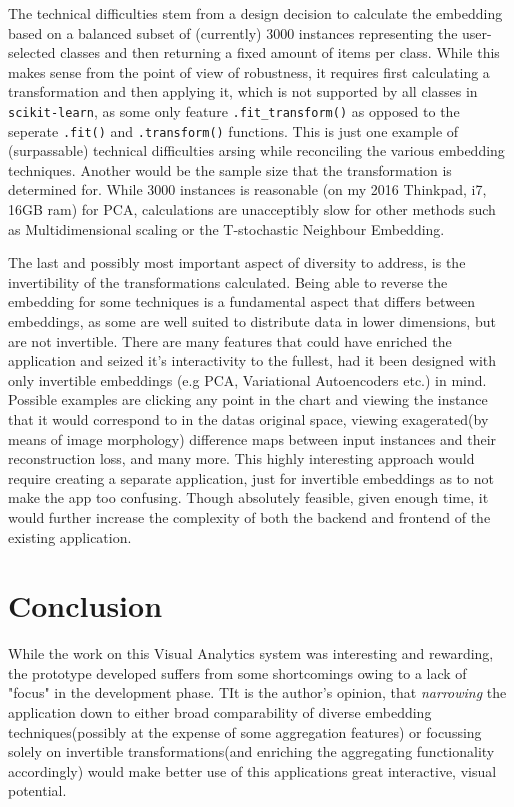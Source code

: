 \documentclass[11pt,a4paper]{article}
\begin{document}
        The technical difficulties stem from a design decision to calculate the embedding based on a balanced subset of (currently) 3000 instances representing the user-selected classes and then returning a fixed amount of items per class. While this makes sense from the point of view of robustness, it requires first calculating a transformation and then applying it, which is not supported by all classes in \texttt{scikit-learn}, as some only feature \texttt{.fit\_transform()} as opposed to the seperate \texttt{.fit()} and \texttt{.transform()} functions. This is just one example of (surpassable) technical difficulties arsing while reconciling the various embedding techniques. Another would be the sample size that the transformation is determined for. While 3000 instances is reasonable (on my 2016 Thinkpad, i7, 16GB ram) for PCA, calculations are unacceptibly slow for other methods such as Multidimensional scaling or the T-stochastic Neighbour Embedding.

        The last and possibly most important aspect of diversity to address, is the invertibility of the transformations calculated. Being able to reverse the embedding for some techniques is a fundamental aspect that differs between embeddings, as some are well suited to distribute data in lower dimensions, but are not invertible. There are many features that could have enriched the application and seized it's interactivity to the fullest, had it been designed with only invertible embeddings (e.g PCA, Variational Autoencoders etc.) in mind. Possible examples are clicking any point in the chart and viewing the instance that it would correspond to in the datas original space, viewing exagerated(by means of image morphology) difference maps between input instances and their reconstruction loss, and many more. This highly interesting approach would require creating a separate application, just for invertible embeddings as to not make the app too confusing. Though absolutely feasible, given enough time, it would further increase the complexity of both the backend and frontend of the existing application.  

    \section{Conclusion}
        While the work on this Visual Analytics system was interesting and rewarding, the prototype developed suffers from some shortcomings owing to a lack of "focus" in the development phase. TIt is the author's opinion, that \textit{narrowing} the application down to either broad comparability of diverse embedding techniques(possibly at the expense of some aggregation features) or focussing solely on invertible transformations(and enriching the aggregating functionality accordingly) would make better use of this applications great interactive, visual potential. 

  
  

  
\end{document}
